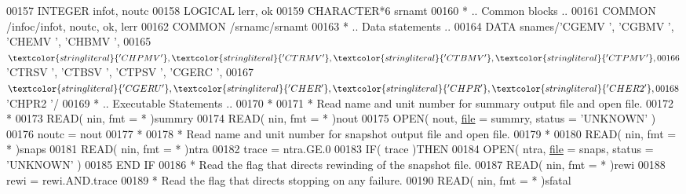 \begin{DoxyCode}
00157       \textcolor{keywordtype}{INTEGER}            infot, noutc
00158       \textcolor{keywordtype}{LOGICAL}            lerr, ok
00159       \textcolor{keywordtype}{CHARACTER*6}        srnamt
00160 \textcolor{comment}{*     .. Common blocks ..}
00161       \textcolor{keyword}{COMMON}             /infoc/infot, noutc, ok, lerr
00162       \textcolor{keyword}{COMMON}             /srnamc/srnamt
00163 \textcolor{comment}{*     .. Data statements ..}
00164       \textcolor{keyword}{DATA}               snames/\textcolor{stringliteral}{'CGEMV '}, \textcolor{stringliteral}{'CGBMV '}, \textcolor{stringliteral}{'CHEMV '}, \textcolor{stringliteral}{'CHBMV '},
00165      $                   \textcolor{stringliteral}{'CHPMV '}, \textcolor{stringliteral}{'CTRMV '}, \textcolor{stringliteral}{'CTBMV '}, \textcolor{stringliteral}{'CTPMV '},
00166      $                   \textcolor{stringliteral}{'CTRSV '}, \textcolor{stringliteral}{'CTBSV '}, \textcolor{stringliteral}{'CTPSV '}, \textcolor{stringliteral}{'CGERC '},
00167      $                   \textcolor{stringliteral}{'CGERU '}, \textcolor{stringliteral}{'CHER  '}, \textcolor{stringliteral}{'CHPR  '}, \textcolor{stringliteral}{'CHER2 '},
00168      $                   \textcolor{stringliteral}{'CHPR2 '}/
00169 \textcolor{comment}{*     .. Executable Statements ..}
00170 \textcolor{comment}{*}
00171 \textcolor{comment}{*     Read name and unit number for summary output file and open file.}
00172 \textcolor{comment}{*}
00173       \textcolor{keyword}{READ}( nin, fmt = * )summry
00174       \textcolor{keyword}{READ}( nin, fmt = * )nout
00175       \textcolor{keyword}{OPEN}( nout, \hyperlink{structfile}{file} = summry, status = \textcolor{stringliteral}{'UNKNOWN'} )
00176       noutc = nout
00177 \textcolor{comment}{*}
00178 \textcolor{comment}{*     Read name and unit number for snapshot output file and open file.}
00179 \textcolor{comment}{*}
00180       \textcolor{keyword}{READ}( nin, fmt = * )snaps
00181       \textcolor{keyword}{READ}( nin, fmt = * )ntra
00182       trace = ntra.GE.0
00183       \textcolor{keywordflow}{IF}( trace )\textcolor{keywordflow}{THEN}
00184          \textcolor{keyword}{OPEN}( ntra, \hyperlink{structfile}{file} = snaps, status = \textcolor{stringliteral}{'UNKNOWN'} )
00185 \textcolor{keywordflow}{      END IF}
00186 \textcolor{comment}{*     Read the flag that directs rewinding of the snapshot file.}
00187       \textcolor{keyword}{READ}( nin, fmt = * )rewi
00188       rewi = rewi.AND.trace
00189 \textcolor{comment}{*     Read the flag that directs stopping on any failure.}
00190       \textcolor{keyword}{READ}( nin, fmt = * )sfatal

\end{DoxyCode}
